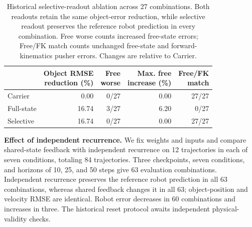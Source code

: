 \begin{table}[!tbp]\centering\small

\setlength{\tabcolsep}{3pt}
\begin{tabular}{lrrrr}\toprule
& \shortstack{Object RMSE\\reduction (\%)} & \shortstack{Free\\worse} & \shortstack{Max. free\\increase (\%)} & \shortstack{Free/FK\\match}\\\midrule
Carrier & 0.00 & 0/27 & 0.00 & 27/27\\
Full-state & 16.74 & 3/27 & 6.20 & 0/27\\
Selective & 16.74 & 0/27 & 0.00 & 27/27\\
\bottomrule\end{tabular}\caption{Historical selective-readout ablation across 27 combinations. Both readouts retain the same object-error reduction, while selective readout preserves the reference robot prediction in every combination. Free worse counts increased free-state errors; Free/FK match counts unchanged free-state and forward-kinematics pusher errors. Changes are relative to Carrier.}
\label{tab:historical-publication}
\end{table}
\noindent\hspace*{1em}\textbf{Effect of independent recurrence.} We fix weights and inputs and compare shared-state feedback with independent recurrence on 12 trajectories in each of seven conditions, totaling 84 trajectories. Three checkpoints, seven conditions, and horizons of 10, 25, and 50 steps give 63 evaluation combinations. Independent recurrence preserves the reference robot prediction in all 63 combinations, whereas shared feedback changes it in all 63; object-position and velocity RMSE are identical. Robot error decreases in 60 combinations and increases in three. The historical reset protocol awaits independent physical-validity checks.




